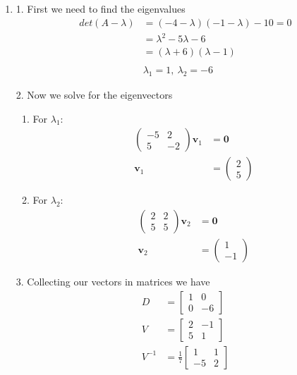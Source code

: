 \documentclass[12pt]{article}
\begin{document}
\begin{enumerate}
  \item [(a)]
        1. First we need to find the eigenvalues
        \begin{align*}
          det(A - \lambda{}) & = (-4-\lambda{})(-1-\lambda{}) -10 = 0 \\
                             & = \lambda^{2} -5\lambda{} -6           \\
                             & = (\lambda{}+ 6)(\lambda{} -1)         \\\\
                             & \lambda_{1} = 1,~ \lambda_{2} = -6
        \end{align*}

        2. Now we solve for the eigenvectors
        \begin{enumerate}
          \item For $\lambda_{1}$:
                \begin{align*}
                  \begin{pmatrix} -5 & 2 \\ 5 & -2\end{pmatrix}\mathbf{v}_1 & = \mathbf{0}                           \\
                  \mathbf{v}_1                                              & =  \begin{pmatrix} 2 \\ 5\end{pmatrix}
                \end{align*}
          \item For $\lambda_{2}$:
                \begin{align*}
                  \begin{pmatrix} 2 & 2 \\ 5 & 5\end{pmatrix}\mathbf{v}_2 & = \mathbf{0}                            \\
                  \mathbf{v}_2                                            & =  \begin{pmatrix} 1 \\ -1\end{pmatrix}
                \end{align*}
        \end{enumerate}

        3. Collecting our vectors in matrices we have
        \begin{align*}
          D      & = \begin{bmatrix} 1 & 0 \\ 0 & -6\end{bmatrix}              \\
          V      & = \begin{bmatrix} 2 & -1 \\ 5 &  1\end{bmatrix}             \\
          V^{-1} & = \frac{1}{7} \begin{bmatrix} 1 & 1 \\ -5 &  2\end{bmatrix}
        \end{align*}


\end{enumerate}
\end{document}
